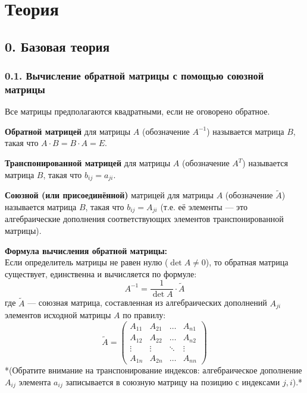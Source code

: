 \section*{Теория}

\subsection*{0. Базовая теория}

\subsubsection*{0.1. Вычисление обратной матрицы с помощью союзной матрицы}

\noindent Все матрицы предполагаются квадратными, если не оговорено обратное.

\begin{definition}
\textbf{Обратной матрицей} для матрицы $A$ (обозначение $A^{-1}$) называется матрица $B$, такая что $A \cdot B = B \cdot A = E$.
\end{definition}

\begin{definition}
\textbf{Транспонированной матрицей} для матрицы $A$ (обозначение $A^T$) называется матрица $B$, такая что $b_{ij} = a_{ji}$.
\end{definition}

\begin{definition}
\textbf{Союзной (или присоединённой)} матрицей для матрицы $A$ (обозначение $\tilde{A}$) называется матрица $B$, такая что $b_{ij} = A_{ji}$ (т.е. её элементы — это алгебраические дополнения соответствующих элементов транспонированной матрицы).
\end{definition}

\noindent\textbf{Формула вычисления обратной матрицы:} \\
Если определитель матрицы не равен нулю ($\det A \neq 0$), то обратная матрица существует, единственна и вычисляется по формуле:
\[
A^{-1} = \frac{1}{\det A} \cdot \tilde{A}
\]
где $\tilde{A}$ — союзная матрица, составленная из алгебраических дополнений $A_{ji}$ элементов исходной матрицы $A$ по правилу:
\[
\tilde{A} = \begin{pmatrix}
A_{11} & A_{21} & \dots & A_{n1} \\
A_{12} & A_{22} & \dots & A_{n2} \\
\vdots & \vdots & \ddots & \vdots \\
A_{1n} & A_{2n} & \dots & A_{nn}
\end{pmatrix}
\]
*(Обратите внимание на транспонирование индексов: алгебраическое дополнение $A_{ij}$ элемента $a_{ij}$ записывается в союзную матрицу на позицию с индексами $j, i$).*

